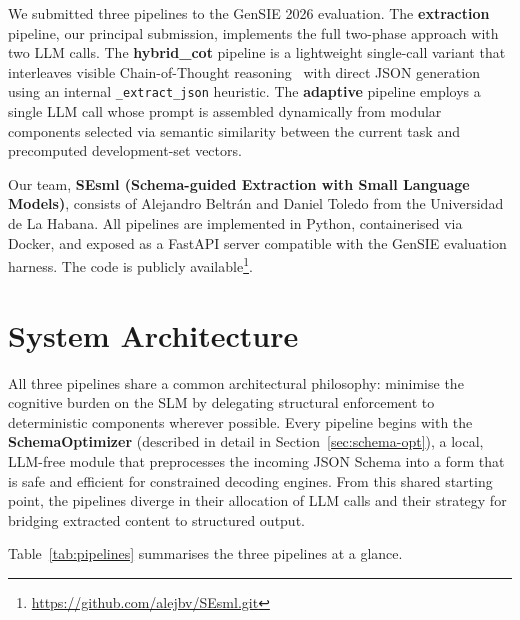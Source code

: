 \documentclass[onecolumn]{ceurart}
\begin{document}
We submitted three pipelines to the GenSIE 2026 evaluation. The
\textbf{extraction} pipeline, our principal submission, implements the full
two-phase approach with two LLM calls. The \textbf{hybrid\_cot} pipeline is a
lightweight single-call variant that interleaves visible Chain-of-Thought
reasoning~\citep{wei2022chain} with direct JSON generation using an internal
\texttt{\_extract\_json} heuristic. The \textbf{adaptive} pipeline employs a
single LLM call whose prompt is assembled dynamically from modular components
selected via semantic similarity between the current task and precomputed
development-set vectors.

Our team, \textbf{SEsml (Schema-guided Extraction with Small Language Models)},
consists of Alejandro Beltr\'{a}n and Daniel Toledo from the Universidad de La
Habana. All pipelines are implemented in Python, containerised via Docker, and
exposed as a FastAPI server compatible with the GenSIE evaluation harness. The
code is publicly available\footnote{\url{https://github.com/alejbv/SEsml.git}}.


\section{System Architecture}
\label{sec:architecture}

All three pipelines share a common architectural philosophy: minimise the
cognitive burden on the SLM by delegating structural enforcement to
deterministic components wherever possible. Every pipeline begins with the
\textbf{SchemaOptimizer} (described in detail in Section~\ref{sec:schema-opt}),
a local, LLM-free module that preprocesses the incoming JSON Schema into a form
that is safe and efficient for constrained decoding engines. From this shared
starting point, the pipelines diverge in their allocation of LLM calls and
their strategy for bridging extracted content to structured output.

Table~\ref{tab:pipelines} summarises the three pipelines at a glance.
\end{document}
